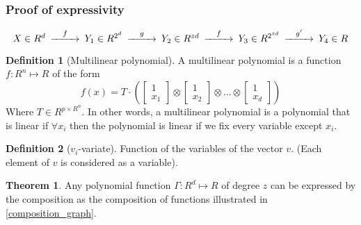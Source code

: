 \documentclass[11pt]{article}
\theoremstyle{definition}
\newtheorem{definition}{Definition}[section]
\newtheorem{theorem}{Theorem}[section]
\theoremstyle{definition}
\begin{document}
\subsubsection{Proof of expressivity}


\begin{equation} \label{composition_graph}
    \begin{CD}
        @. X \in R^d 
        @>f>> Y_1 \in R^{2^d}
        @>g>> Y_2 \in R^{zd} 
        @>f>> Y_3 \in R^{2^{zd}}
        @>g'>> Y_4 \in R
    \end{CD}
\end{equation}


\begin{definition}[Multilinear polynomial]
    A multilinear polynomial is a function $f: R^n \mapsto R$ of the form
    \begin{equation}
        f(x) = T \cdot \left( 
            \begin{bmatrix} 1 \\ x_1 \end{bmatrix} \otimes 
            \begin{bmatrix} 1 \\ x_2 \end{bmatrix} \otimes 
            \dots \otimes 
            \begin{bmatrix} 1 \\ x_d \end{bmatrix}
        \right)
    \end{equation}
    Where $T \in R^{p \times R^n }$. In other words, a multilinear polynomial is a polynomial that is linear if  $\forall x_i$ then the polynomial is linear if we fix every variable except $x_i$.
\end{definition}

\begin{definition}[$v_i$-variate]
Function of the variables of the vector $v$. (Each element of $v$ is considered as a variable).
\end{definition}


\begin{theorem}
    Any polynomial function $\Gamma: R^d \mapsto R$ of degree $z$ can be expressed by the composition
    as the composition of functions illustrated in \ref{composition_graph}.
\end{theorem}
\end{document}
